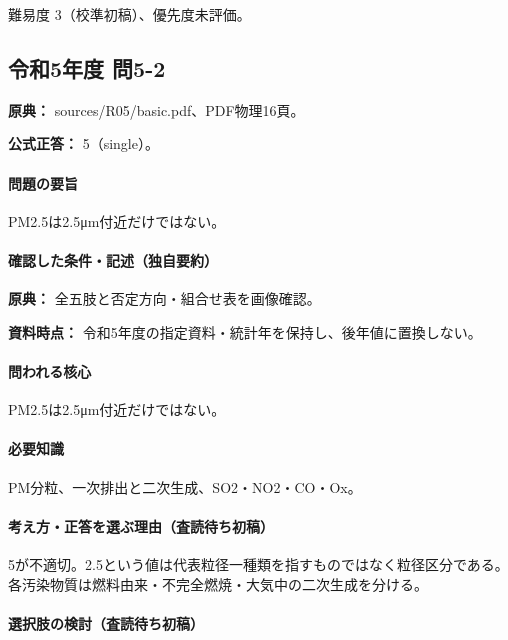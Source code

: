 \par 難易度 3（校準初稿）、優先度未評価。

\subsection{令和5年度 問5-2}
\label{q:r05-reg-basic-5-2}

\noindent\textbf{原典：} sources/R05/basic.pdf、PDF物理16頁。

\textbf{公式正答：} 5（single）。

\paragraph{問題の要旨} PM2.5は2.5μm付近だけではない。

\paragraph{確認した条件・記述（独自要約）}\mbox{}\par

\noindent\textbf{原典：} 全五肢と否定方向・組合せ表を画像確認。\par

\noindent\textbf{資料時点：} 令和5年度の指定資料・統計年を保持し、後年値に置換しない。\par

\paragraph{問われる核心} PM2.5は2.5μm付近だけではない。

\paragraph{必要知識} PM分粒、一次排出と二次生成、SO2・NO2・CO・Ox。

\paragraph{考え方・正答を選ぶ理由（査読待ち初稿）} 5が不適切。2.5という値は代表粒径一種類を指すものではなく粒径区分である。各汚染物質は燃料由来・不完全燃焼・大気中の二次生成を分ける。

\paragraph{選択肢の検討（査読待ち初稿）}\mbox{}\par

